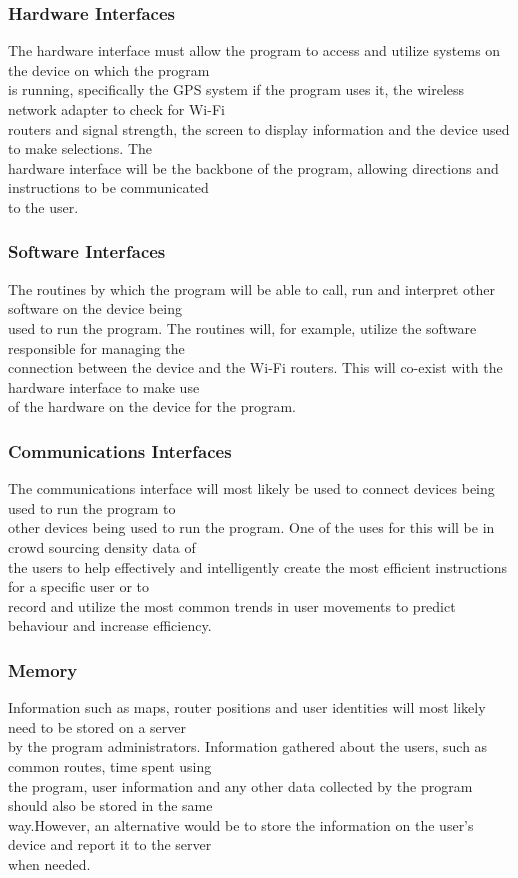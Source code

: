 \documentclass[a4paper,10pt]{article}
\begin{document}
		\subsubsection{Hardware Interfaces}
			The hardware interface must allow the program to access and utilize systems on the device on which the program\\			is running, specifically the GPS system if the program uses it, the wireless network adapter to check for Wi-Fi\\			routers and signal strength, the screen to display information and the device used to make selections. The\\				hardware interface will be the backbone of the program, allowing directions and instructions to be communicated\\			to the user.\\
		\subsubsection{Software Interfaces}
			The routines by which the program will be able to call, run and interpret other software on the device being\\				used to run the program. The routines will, for example, utilize the software responsible for managing the\\ 				connection between the device and the Wi-Fi routers. This will co-exist with the hardware interface to make use\\			of the hardware on the device for the program.\\
		\subsubsection{Communications Interfaces}
			The communications interface will most likely be used to connect devices being used to run the program to\\				other devices being used to run the program. One of the uses for this will be in crowd sourcing density data of\\			the users to help effectively and intelligently create the most efficient instructions for a specific user or to\\			record and utilize the most common trends in user movements to predict behaviour and increase efficiency.\\
		\subsubsection{Memory}
			Information such as maps, router positions and user identities will most likely need to be stored on a server\\ 			by the program administrators. Information gathered about the users, such as common routes, time spent using\\ 				the program, user information and any other data collected by the program should also be stored in the same\\ 				way.However, an alternative would be to store the information on the user's device and report it to the server\\ 			when needed.\\   
\end{document}
